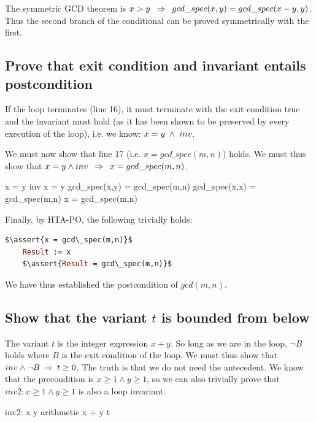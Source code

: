\documentclass[runningheads,12pt]{article}
\def\assert#1{\textcolor{red}{ {\{} {#1} {\}}}}
\begin{document}
The symmetric GCD theorem is $x > y \; \; \mathbin\Rightarrow \; \; gcd\_spec(x,y) = gcd\_spec(x-y,y)$. Thus the second branch of the conditional can be proved symmetrically with the first. 


\subsection{Prove that exit condition and invariant entails postcondition} 

If the loop terminates (line 16), it must terminate with the exit condition true and the invariant must hold (as it has been shown to be preserved by every execution of the loop), i.e. we know: $x = y \; \land \; inv$.

We must now show that line 17 (i.e. $x = gcd\_spec(m,n)$) holds. We must thus show that $x = y \land inv \; \; \mathbin\Rightarrow \; \; x = gcd\_spec(m,n)$.
	
\begin{calculation}
	x = y \1\land inv
	x = y \1\land gcd\_spec(x,y) = gcd\_spec(m,n)
	gcd\_spec(x,x) = gcd\_spec(m,n)
	x = gcd\_spec(m,n) \qquad\blacksquare
\end{calculation}

Finally, by HTA-PO, the following trivially holds:
\begin{lstlisting}[language=eiffel]
    $\assert{x = gcd\_spec(m,n)}$
    Result := x
    $\assert{Result = gcd\_spec(m,n)}$
\end{lstlisting} 

We have thus established the postcondition of $gcd(m,n)$.  

\subsection{Show that the variant $t$ is bounded from below}

The variant $t$ is the integer expression $x+y$. So long as we are in the loop, $\lnot B$ holds where $B$ is the exit condition of the loop. We must thus show that $inv \land \lnot B \; \mathbin\Rightarrow \; t \geq 0$. The truth is that we do not need the antecedent. We know that the precondition is $x \geq 1 \land y \geq 1$, so we can also trivially prove that $inv2: x \geq 1 \land y \geq 1$ is also a loop invariant. 

\begin{calculation}
	inv2: x  \land y 
\hint{\limp} {arithmetic}
	x + y 
	t  \qquad\blacksquare
\end{calculation}
%
\end{document}
